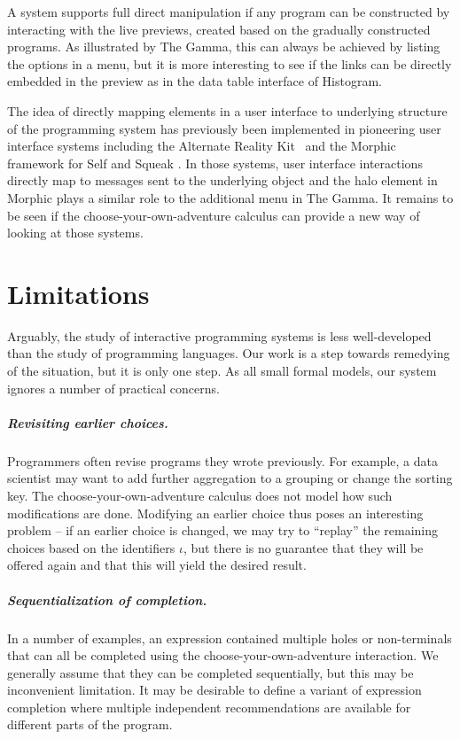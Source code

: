 \documentclass[anonymous, a4paper,UKenglish,cleveref, autoref, thm-restate]{lipics-v2021}
\begin{document}
A system supports full direct manipulation if any program can be constructed by interacting with
the live previews, created based on the gradually constructed programs. As illustrated by The Gamma,
this can always be achieved by listing the options in a menu, but it is more interesting to see
if the links can be directly embedded in the preview as in the data table interface of Histogram.

The idea of directly mapping elements in a user interface to underlying structure of the
programming system has previously been implemented in pioneering user interface systems
including the Alternate Reality Kit~\cite{randall-1986-ark} and the Morphic framework for
Self and Squeak \cite{maloney-1995-morphic,maloney-2001-morphic}. In those systems, user interface
interactions directly map to messages sent to the underlying object and the halo element in
Morphic plays a similar role to the additional menu in The Gamma. It remains to be seen if
the choose-your-own-adventure calculus can provide a new way of looking at those systems.

\section{Limitations}
\label{sec:limitations}

Arguably, the study of interactive programming systems is less well-developed than the study
of programming languages. Our work is a step towards remedying of the situation, but it is
only one step. As all small formal models, our system ignores a number of practical concerns.

\subparagraph{Revisiting earlier choices.}
Programmers often revise programs they wrote previously. For example, a data
scientist may want to add further aggregation to a grouping or change the sorting key.
The choose-your-own-adventure calculus does not model how such modifications are done.
Modifying an earlier choice thus poses an interesting problem -- if an earlier choice is
changed, we may try to ``replay'' the remaining choices based on the identifiers $\iota$,
but there is no guarantee that they will be offered again and that this will yield the
desired result.

\subparagraph{Sequentialization of completion.}
In a number of examples, an expression contained multiple holes or non-terminals that can
all be completed using the choose-your-own-adventure interaction. We generally assume that they
can be completed sequentially, but this may be inconvenient limitation. It may be desirable to
define a variant of expression completion where multiple independent recommendations are
available for different parts of the program.
\end{document}
